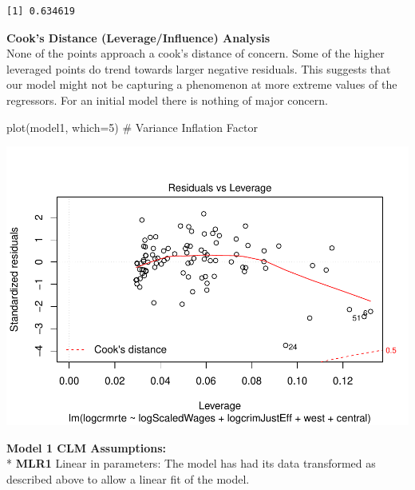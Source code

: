 \documentclass[]{article}
\newenvironment{Shaded}{}{}
\newcommand{\CommentTok}[1]{\textcolor[rgb]{0.00,0.50,0.00}{#1}}
\newcommand{\DataTypeTok}[1]{#1}
\newcommand{\DecValTok}[1]{#1}
\newcommand{\KeywordTok}[1]{\textcolor[rgb]{0.00,0.00,1.00}{#1}}
\newcommand{\NormalTok}[1]{#1}
\newcommand{\OperatorTok}[1]{#1}
\begin{document}
\begin{Shaded}
\end{Shaded}

\begin{verbatim}
[1] 0.634619
\end{verbatim}

\textbf{Cook's Distance (Leverage/Influence) Analysis}\\
None of the points approach a cook's distance of concern. Some of the
higher leveraged points do trend towards larger negative residuals. This
suggests that our model might not be capturing a phenomenon at more
extreme values of the regressors. For an initial model there is nothing
of major concern.

\begin{Shaded}
\begin{Highlighting}[]
\KeywordTok{plot}\NormalTok{(model1, }\DataTypeTok{which=}\DecValTok{5}\NormalTok{) }\CommentTok{# Variance Inflation Factor}
\end{Highlighting}
\end{Shaded}

\includegraphics{Bagnard_Gaustad_Hartman_Leung_Lab_3_files/figure-latex/unnamed-chunk-59-1.pdf}

\textbf{Model 1 CLM Assumptions:}\\
* \textbf{MLR1} Linear in parameters: The model has had its data
transformed as described above to allow a linear fit of the model.
\end{document}
